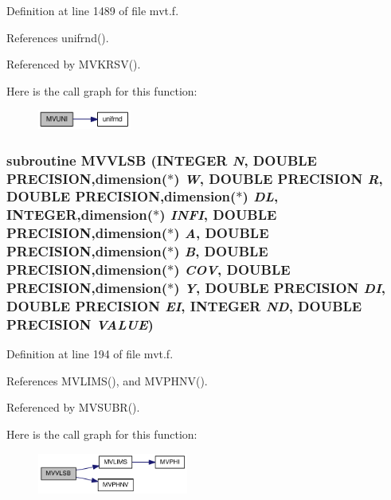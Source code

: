 Definition at line 1489 of file mvt.f.

References unifrnd().

Referenced by MVKRSV().

Here is the call graph for this function:\nopagebreak
\begin{figure}[H]
\begin{center}
\leavevmode
\includegraphics[width=87pt]{mvt_8f_1ab822a6524a9096bf2ec00253f890e3_cgraph}
\end{center}
\end{figure}
\hypertarget{mvt_8f_7319671edcfbb7bd0e50690518e644fc}{
\subsubsection[{MVVLSB}]{\setlength{\rightskip}{0pt plus 5cm}subroutine MVVLSB (INTEGER {\em N}, \/  DOUBLE PRECISION,dimension($\ast$) {\em W}, \/  DOUBLE PRECISION {\em R}, \/  DOUBLE PRECISION,dimension($\ast$) {\em DL}, \/  INTEGER,dimension($\ast$) {\em INFI}, \/  DOUBLE PRECISION,dimension($\ast$) {\em A}, \/  DOUBLE PRECISION,dimension($\ast$) {\em B}, \/  DOUBLE PRECISION,dimension($\ast$) {\em COV}, \/  DOUBLE PRECISION,dimension($\ast$) {\em Y}, \/  DOUBLE PRECISION {\em DI}, \/  DOUBLE PRECISION {\em EI}, \/  INTEGER {\em ND}, \/  DOUBLE PRECISION {\em VALUE})}}
\label{mvt_8f_7319671edcfbb7bd0e50690518e644fc}




Definition at line 194 of file mvt.f.

References MVLIMS(), and MVPHNV().

Referenced by MVSUBR().

Here is the call graph for this function:\nopagebreak
\begin{figure}[H]
\begin{center}
\leavevmode
\includegraphics[width=140pt]{mvt_8f_7319671edcfbb7bd0e50690518e644fc_cgraph}
\end{center}
\end{figure}
